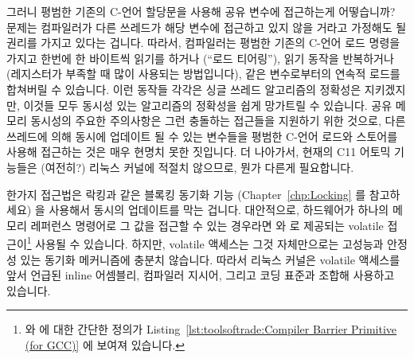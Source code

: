 \begin{lineref}
\begin{lineref}
{	그러니 평범한 기존의 C-언어 할당문을 사용해 공유 변수에 접근하는게
	어떻습니까?
	문제는 컴파일러가 다른 쓰레드가 해당 변수에 접근하고 있지 않을 거라고
	가정해도 될 권리를 가지고 있다는 겁니다.
	따라서, 컴파일러는 평범한 기존의 C-언어 로드 명령을 가지고 한번에 한
	바이트씩 읽기를 하거나 (``로드 티어링''), 읽기 동작을 반복하거나
	(레지스터가 부족할 때 많이 사용되는 방법입니다), 같은 변수로부터의
	연속적 로드를 합쳐버릴 수 있습니다.
	이런 동작들 각각은 싱글 쓰레드 알고리즘의 정확성은 지키겠지만, 이것들
	모두 동시성 있는 알고리즘의 정확성을 쉽게 망가트릴 수 있습니다.
	공유 메모리 동시성의 주요한 주의사항은 그런 충돌하는 접근들을 지원하기
	위한 것으로, 다른 쓰레드에 의해 동시에 업데이트 될 수 있는 변수들을
	평범한 C-언어 로드와 스토어를 사용해 접근하는 것은 매우 현명치 못한
	짓입니다.
	더 나아가서, 현재의 C11 어토믹 기능들은 (여전히?) 리눅스 커널에 적절치
	않으므로, 뭔가 다른게 필요합니다.

	한가지 접근법은 락킹과 같은 블록킹 동기화 기능
	(Chapter~\ref{chp:Locking} 를 참고하세요) 을 사용해서 동시의 업데이트를
	막는 겁니다.
	대안적으로, 하드웨어가 하나의 메모리 레퍼런스 명령어로 그 값을 접근할
	수 있는 경우라면  와  로 제공되는
	volatile 접근이\footnote{
		 와  에 대한 간단한 정의가
		Listing~\ref{lst:toolsoftrade:Compiler Barrier Primitive (for
		GCC)} 에 보여져 있습니다.}
	사용될 수 있습니다.
	하지만, volatile 액세스는 그것 자체만으로는 고성능과 안정성 있는 동기화
	메커니즘에 충분치 않습니다.
	따라서 리눅스 커널은 volatile 액세스를 앞서 언급된 inline 어셈블리,
	컴파일러 지시어, 그리고 코딩 표준과 조합해 사용하고 있습니다.
	\iffalse

}
\end{lineref}
\end{lineref}
